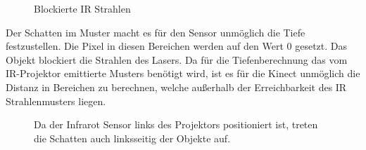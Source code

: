 \begin{figure}[!ht]
  \centering
   \caption{Blockierte IR Strahlen }
\end{figure}
Der Schatten im Muster macht es für den Sensor unmöglich die Tiefe festzustellen. Die Pixel in diesen Bereichen werden auf den Wert 0 gesetzt.
Das Objekt blockiert die Strahlen des Lasers. Da für die Tiefenberechnung das vom IR-Projektor emittierte Musters benötigt wird, ist es für die Kinect unmöglich die Distanz in Bereichen zu berechnen, welche außerhalb der Erreichbarkeit des IR Strahlenmusters liegen. \\
\begin{figure}[!ht]
  \centering
   \caption{Da der Infrarot Sensor links des Projektors positioniert ist, treten die Schatten auch linksseitig der Objekte auf.  }
\end{figure}